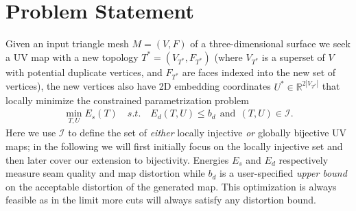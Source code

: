 
\section{Problem Statement}

Given an input triangle mesh $M=(V,F)$ of a three-dimensional surface we seek a UV map with a new topology $T^*=(V_{T^*}, F_{T^*})$ (where $V_{T^*}$ is a superset of $V$ with potential duplicate vertices, and $F_{T^*}$ are faces indexed into the new set of vertices), the new vertices also have 2D embedding coordinates $U^* \in \mathbb{R}^{2 |V_{T^*}|}$ that locally minimize the constrained parametrization problem
%
\begin{align}
	\min_{T,U} E_s(T) \quad s.t. \quad E_d(T,U) \leq b_d\ \ \text{and}\ \ (T, U) \in \mathcal{I}.
	\label{eq:p1}
\end{align}
%
Here we use $\mathcal{I}$ to define the set of \emph{either} locally injective \emph{or} globally bijective UV maps; in the following we will first initially focus on the locally injective set and then later cover our extension to bijectivity. Energies $E_s$ and $E_d$ respectively measure seam quality and map distortion while $b_d$ is a user-specified \emph{upper bound} on the acceptable distortion of the generated map. This optimization is always feasible as in the limit more cuts will always satisfy any distortion bound. %

